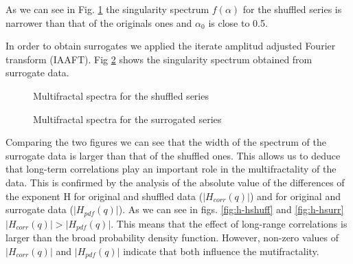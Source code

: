\documentclass[onecolumn, preprint,aps,amsmath, amssymb, superscriptaddress]{revtex4}
\begin{document}
As we can see in Fig. \ref{fig:spectrum_shuffle} the singularity spectrum $f(\alpha)$ for the shuffled series is narrower than that of the originals ones and $\alpha_0$ is close to 0.5. 

In order to obtain surrogates we applied the iterate amplitud adjusted Fourier transform (IAAFT). Fig \ref{fig:spectrum_surrogate} shows the singularity spectrum obtained from surrogate data. 


\begin{figure}
\caption{Multifractal spectra for the shuffled series}
\label{fig:spectrum_shuffle}
\end{figure}

\begin{figure}
\caption{Multifractal spectra for the surrogated series}
\label{fig:spectrum_surrogate}
\end{figure}

Comparing the two figures we can see that the width of the spectrum of the surrogate data is larger than that of the shuffled ones. This allows us to deduce that long-term correlations play an important role in the multifractality of the data. This is confirmed by the analysis of the absolute value of the differences of the exponent H for original and shuffled data ($\lvert H_{corr}(q)\rvert$) and for original and surrogate data ($\lvert H_{pdf}(q)\rvert$). As we can see in figs. \ref{fig:h-hshuff} and \ref{fig:h-hsurr} $\lvert H_{corr}(q)\rvert > \lvert H_{pdf}(q)\rvert$. This means that the effect of long-range correlations is larger than the broad probability density function. However, non-zero values of $\lvert H_{corr}(q)\rvert$ and $\lvert H_{pdf}(q)\rvert$ indicate that both influence the mutifractality.
\end{document}
